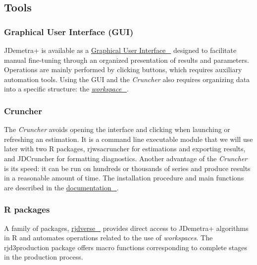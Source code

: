 \documentclass[
  letterpaper,
  DIV=11,
  numbers=noendperiod]{scrreprt}
\begin{document}
\hypertarget{tools}{%
\subsection*{Tools}\label{tools}}

\hypertarget{graphical-user-interface-gui}{%
\subsubsection*{Graphical User Interface
(GUI)}\label{graphical-user-interface-gui}}

JDemetra+ is available as a
\href{https://doc.jdemetra.org/t-gui-overview}{Graphical User
Interface~🔗} designed to facilitate manual fine-tuning through an
organized presentation of results and parameters. Operations are mainly
performed by clicking buttons, which requires auxiliary automation
tools. Using the GUI and the \emph{Cruncher} also requires organizing
data into a specific structure: the
\protect\hyperlink{sec-concept-workspace}{\emph{workspace}~🔗}.

\hypertarget{Cruncher}{%
\subsubsection*{Cruncher}\label{Cruncher}}

The \emph{Cruncher} avoids opening the interface and clicking when
launching or refreshing an estimation. It is a command line executable
module that we will use later with two R packages, rjwsacruncher for
estimations and exporting results, and JDCruncher for formatting
diagnostics. Another advantage of the \emph{Cruncher} is its speed: it
can be run on hundreds or thousands of series and produce results in a
reasonable amount of time. The installation procedure and main functions
are described in the
\href{https://doc.jdemetra.org/t-production-tools-Cruncher-qr}{documentation~🔗}.

\hypertarget{r-packages}{%
\subsubsection*{R packages}\label{r-packages}}

A family of packages, \href{https://github.com/rjdverse}{rjdverse~🔗}
provides direct access to JDemetra+ algorithms in R and automates
operations related to the use of \emph{workspaces}. The rjd3production
package offers macro functions corresponding to complete stages in the
production process.
\end{document}
